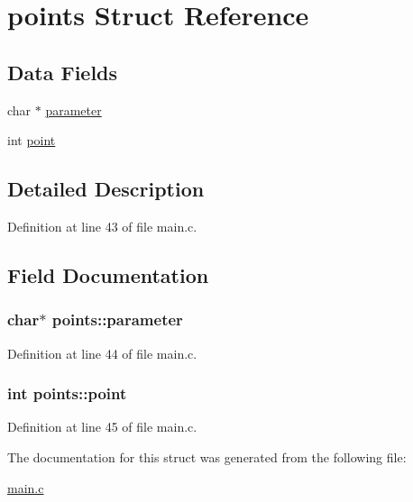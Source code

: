 \hypertarget{structpoints}{\section{points Struct Reference}
\label{structpoints}
}
\subsection*{Data Fields}
\begin{DoxyCompactItemize}
\item 
char $\ast$ \hyperlink{structpoints_a006c88452ba4166f7aecf4e7c6d13cb7}{parameter}
\item 
int \hyperlink{structpoints_a41c32110b6e598eefc21bf4d775aec85}{point}
\end{DoxyCompactItemize}


\subsection{Detailed Description}


Definition at line 43 of file main.\+c.



\subsection{Field Documentation}
\hypertarget{structpoints_a006c88452ba4166f7aecf4e7c6d13cb7}{
\subsubsection[{parameter}]{\setlength{\rightskip}{0pt plus 5cm}char$\ast$ points\+::parameter}}\label{structpoints_a006c88452ba4166f7aecf4e7c6d13cb7}


Definition at line 44 of file main.\+c.

\hypertarget{structpoints_a41c32110b6e598eefc21bf4d775aec85}{
\subsubsection[{point}]{\setlength{\rightskip}{0pt plus 5cm}int points\+::point}}\label{structpoints_a41c32110b6e598eefc21bf4d775aec85}


Definition at line 45 of file main.\+c.



The documentation for this struct was generated from the following file\+:\begin{DoxyCompactItemize}
\item 
\hyperlink{main_8c}{main.\+c}\end{DoxyCompactItemize}
